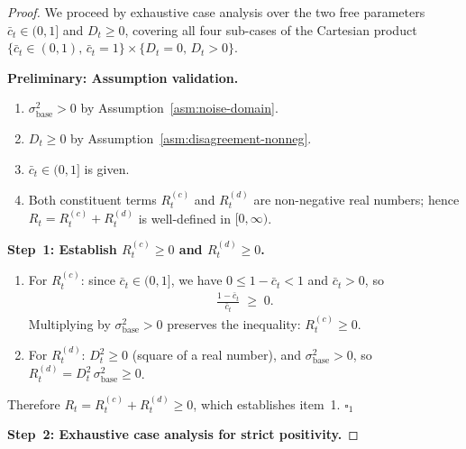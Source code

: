\documentclass[12pt,openany]{book}
\numberwithin{equation}{chapter}
\theoremstyle{plain}
\theoremstyle{definition}
\theoremstyle{remark}
\begin{document}
\begin{proof}
We proceed by exhaustive case analysis over the two free
parameters $\bar{c}_t \in (0,1]$ and $D_t \geq 0$,
covering all four sub-cases of the Cartesian product
$\{\bar{c}_t \in (0,1),\, \bar{c}_t = 1\}
 \times \{D_t = 0,\, D_t > 0\}$.

\medskip
\noindent\textbf{Preliminary: Assumption validation.}
\begin{enumerate}
  \item $\sigma_{\mathrm{base}}^2 > 0$
        by Assumption~\ref{asm:noise-domain}. \checkmark
  \item $D_t \geq 0$ by
        Assumption~\ref{asm:disagreement-nonneg}. \checkmark
  \item $\bar{c}_t \in (0,1]$ is given. \checkmark
  \item Both constituent terms $R_t^{(c)}$ and $R_t^{(d)}$
        are non-negative real numbers; hence
        $R_t = R_t^{(c)} + R_t^{(d)}$ is well-defined in
        $[0,\infty)$. \checkmark
\end{enumerate}

\medskip
\noindent\textbf{Step~1: Establish $R_t^{(c)} \geq 0$ and
$R_t^{(d)} \geq 0$.}
\begin{enumerate}
  \item For $R_t^{(c)}$: since $\bar{c}_t \in (0,1]$,
        we have $0 \leq 1 - \bar{c}_t < 1$ and
        $\bar{c}_t > 0$, so
        \begin{align}
          \frac{1 - \bar{c}_t}{\bar{c}_t} \;\geq\; 0.
          \label{eq:ratio-nonneg}
        \end{align}
        Multiplying by $\sigma_{\mathrm{base}}^2 > 0$ preserves
        the inequality: $R_t^{(c)} \geq 0$.
  \item For $R_t^{(d)}$: $D_t^2 \geq 0$ (square of a real
        number), and $\sigma_{\mathrm{base}}^2 > 0$, so
        $R_t^{(d)} = D_t^2\,\sigma_{\mathrm{base}}^2 \geq 0$.
\end{enumerate}
Therefore $R_t = R_t^{(c)} + R_t^{(d)} \geq 0$, which
establishes item~1. \qquad $\square_1$

\medskip
\noindent\textbf{Step~2: Exhaustive case analysis for
strict positivity.}


\end{proof}
\end{document}

